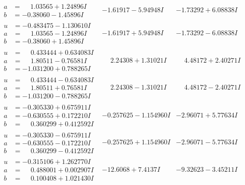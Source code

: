 \documentclass[1p]{elsarticle_modified}
\theoremstyle{definition}
\begin{document}
$$\begin{array}{c|c|c}
\begin{aligned}
a &= \phantom{-}1.03565 + 1.24896 I \\
b &= -0.38060 - 1.45896 I\end{aligned}
 & -1.61917 - 5.94948 I & -1.73292 + 6.08838 I \\ \hline\begin{aligned}
u &= -0.483475 - 1.130610 I \\
a &= \phantom{-}1.03565 - 1.24896 I \\
b &= -0.38060 + 1.45896 I\end{aligned}
 & -1.61917 + 5.94948 I & -1.73292 - 6.08838 I \\ \hline\begin{aligned}
u &= \phantom{-}0.433444 + 0.634083 I \\
a &= \phantom{-}1.80511 - 0.76581 I \\
b &= -1.031200 + 0.788265 I\end{aligned}
 & \phantom{-}2.24308 + 1.31021 I & \phantom{-}4.48172 + 2.40271 I \\ \hline\begin{aligned}
u &= \phantom{-}0.433444 - 0.634083 I \\
a &= \phantom{-}1.80511 + 0.76581 I \\
b &= -1.031200 - 0.788265 I\end{aligned}
 & \phantom{-}2.24308 - 1.31021 I & \phantom{-}4.48172 - 2.40271 I \\ \hline\begin{aligned}
u &= -0.305330 + 0.675911 I \\
a &= -0.630555 + 0.172210 I \\
b &= \phantom{-}0.360299 + 0.412592 I\end{aligned}
 & -0.257625 - 1.154960 I & -2.96071 + 5.77634 I \\ \hline\begin{aligned}
u &= -0.305330 - 0.675911 I \\
a &= -0.630555 - 0.172210 I \\
b &= \phantom{-}0.360299 - 0.412592 I\end{aligned}
 & -0.257625 + 1.154960 I & -2.96071 - 5.77634 I \\ \hline\begin{aligned}
u &= -0.315106 + 1.262770 I \\
a &= \phantom{-}0.488001 + 0.002907 I \\
b &= \phantom{-}0.100408 + 1.021430 I\end{aligned}
 & -12.6068 + 7.4137 I & -9.32623 - 3.45211 I \\ \hline\begin{aligned}

\end{aligned}
\end{array}$$
\end{document}
